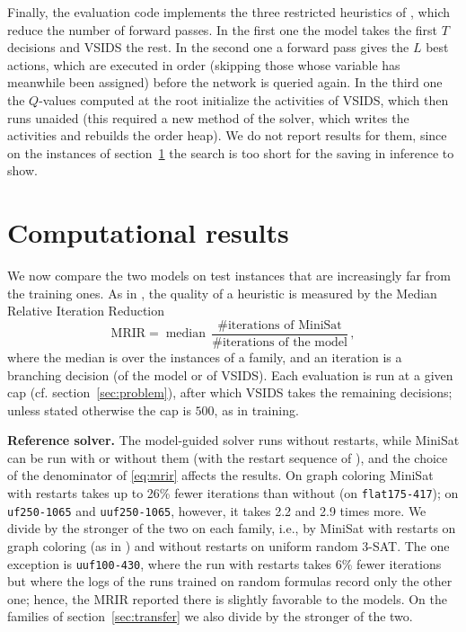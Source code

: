 \documentclass[11pt,a4paper]{article}
\newcommand{\code}[1]{\texttt{\def\_{\textunderscore\allowbreak}#1}}
\newcommand{\MRIR}{\mathrm{MRIR}}
\begin{document}
\smallskip
\noindent
Finally, the evaluation code implements the three restricted heuristics of
\cite{Shirokikh2023}, which reduce the number of forward passes. In the first
one the model takes the first $T$ decisions and VSIDS the rest. In the second
one a forward pass gives the $L$ best actions, which are executed in order
(skipping those whose variable has meanwhile been assigned) before the network
is queried again. In the third one the $Q$-values computed at the root
initialize the activities of VSIDS, which then runs unaided (this required a
new method of the solver, which writes the activities and rebuilds the order
heap). We do not report results for them, since on the instances of
section~\ref{sec:results} the search is too short for the saving in inference
to show.

\section{Computational results}\label{sec:results}

We now compare the two models on test instances that are increasingly far from
the training ones. As in \cite{Kurin2020}, the quality of a heuristic is
measured by the Median Relative Iteration Reduction
\begin{equation}\label{eq:mrir}
  \MRIR = \operatorname{median}\,
          \frac{\#\text{iterations of MiniSat}}{\#\text{iterations of the model}} \, ,
\end{equation}
where the median is over the instances of a family, and an iteration is a
branching decision (of the model or of VSIDS). Each evaluation is run at a
given cap (cf. section~\ref{sec:problem}), after which VSIDS takes the
remaining decisions; unless stated otherwise the cap is $500$, as in training.

\smallskip
\noindent
{\bf Reference solver.} The model-guided solver runs without
restarts, while MiniSat can be run with or without them (with the restart
sequence of \cite{Luby1993}), and the choice of the denominator of
\eqref{eq:mrir} affects the results. On graph coloring MiniSat with
restarts takes up to 26\% fewer iterations than without (on
\code{flat175-417}); on \code{uf250-1065} and \code{uuf250-1065}, however, it
takes 2.2 and 2.9 times more. We divide by the stronger of the two on each
family, i.e., by MiniSat with restarts on graph coloring (as in
\cite{Kurin2020}) and without restarts on uniform random 3-SAT. The one
exception is \code{uuf100-430}, where the run with restarts takes 6\% fewer
iterations but where the logs of the runs trained on random formulas record only the
other one; hence, the MRIR reported there is slightly
favorable to the models. On the families of
section~\ref{sec:transfer} we also divide by the stronger of the two.
\end{document}

